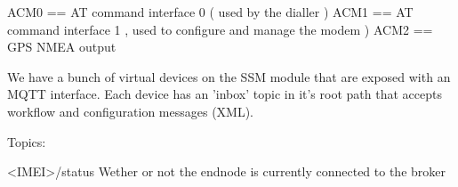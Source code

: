 ACM0 == AT command interface 0 ( used by the dialler )
ACM1 == AT command interface 1 , used to configure and manage the modem )
ACM2 == GPS NMEA output



We have a bunch of virtual devices on the SSM module that are exposed with an
MQTT interface. Each device has an 'inbox' topic in it's root path that accepts
workflow and configuration messages (XML).

Topics:

<IMEI>/status
Wether or not the endnode is currently connected to the broker




    
    
    
    
    
    
    
    
    
    
    
    
    
    
    